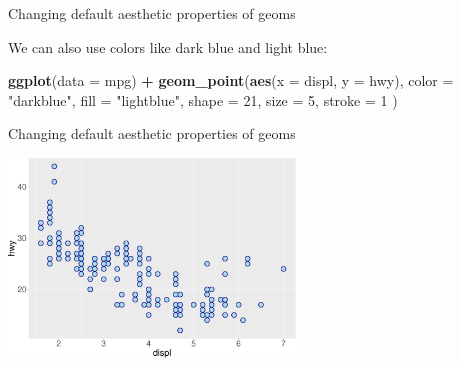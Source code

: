 \documentclass[ignorenonframetext,]{beamer}
\newenvironment{Shaded}{\begin{snugshade}}{\end{snugshade}}
\newcommand{\DataTypeTok}[1]{\textcolor[rgb]{0.13,0.29,0.53}{#1}}
\newcommand{\DecValTok}[1]{\textcolor[rgb]{0.00,0.00,0.81}{#1}}
\newcommand{\KeywordTok}[1]{\textcolor[rgb]{0.13,0.29,0.53}{\textbf{#1}}}
\newcommand{\NormalTok}[1]{#1}
\newcommand{\OperatorTok}[1]{\textcolor[rgb]{0.81,0.36,0.00}{\textbf{#1}}}
\newcommand{\StringTok}[1]{\textcolor[rgb]{0.31,0.60,0.02}{#1}}
\begin{document}
\begin{frame}[fragile]{Changing default aesthetic properties of geoms}
\protect\hypertarget{changing-default-aesthetic-properties-of-geoms-12}{}

We can also use colors like dark blue and light blue:

\begin{Shaded}
\begin{Highlighting}[]
\KeywordTok{ggplot}\NormalTok{(}\DataTypeTok{data =}\NormalTok{ mpg) }\OperatorTok{+}
\StringTok{  }\KeywordTok{geom_point}\NormalTok{(}\KeywordTok{aes}\NormalTok{(}\DataTypeTok{x =}\NormalTok{ displ, }\DataTypeTok{y =}\NormalTok{ hwy),}
    \DataTypeTok{color =} \StringTok{"darkblue"}\NormalTok{,}
    \DataTypeTok{fill =} \StringTok{"lightblue"}\NormalTok{,}
    \DataTypeTok{shape =} \DecValTok{21}\NormalTok{,}
    \DataTypeTok{size =} \DecValTok{5}\NormalTok{,}
    \DataTypeTok{stroke =} \DecValTok{1}
\NormalTok{  )}
\end{Highlighting}
\end{Shaded}

\end{frame}

\begin{frame}{Changing default aesthetic properties of geoms}
\protect\hypertarget{changing-default-aesthetic-properties-of-geoms-13}{}

\begin{center}\includegraphics[height=200px]{data-visualization_files/figure-beamer/unnamed-chunk-49-1} \end{center}

\end{frame}
\end{document}
